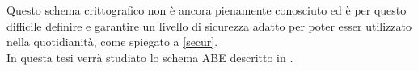 Questo schema crittografico non è ancora pienamente conosciuto ed è per questo difficile definire e garantire un livello di sicurezza adatto per poter esser utilizzato nella quotidianità, come spiegato a \ref{secur}.\\[0.2cm]

In questa tesi verrà studiato lo schema ABE descritto in \cite{kpabe}.









